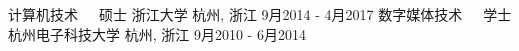 


\begin{cventries}


\cventry
{计算机技术~~~硕士} %
{浙江大学} %
{杭州, 浙江} %
{9月2014 - 4月2017} %
{} %
\cventry
{数字媒体技术~~~学士} %
{杭州电子科技大学} %
{杭州, 浙江} %
{9月2010 - 6月2014} %
{}


\end{cventries}